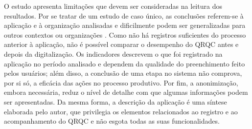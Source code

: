 O estudo apresenta limitações que devem ser consideradas na leitura dos resultados. Por se tratar de um estudo de caso único, as conclusões referem-se à aplicação e à organização analisadas e dificilmente podem ser generalizadas para outros contextos ou organizações \cite[p.~93]{bhattacherjee2012}. Como não há registros suficientes do processo anterior à aplicação, não é possível comparar o desempenho do QRQC antes e depois da digitalização. Os indicadores descrevem o que foi registrado na aplicação no período analisado e dependem da qualidade do preenchimento feito pelos usuários; além disso, a conclusão de uma etapa no sistema não comprova, por si só, a eficácia das ações no processo produtivo. Por fim, a anonimização, embora necessária, reduz o nível de detalhe com que algumas informações podem ser apresentadas. Da mesma forma, a descrição da aplicação é uma síntese elaborada pelo autor, que privilegia os elementos relacionados ao registro e ao acompanhamento do QRQC e não esgota todas as suas funcionalidades.
